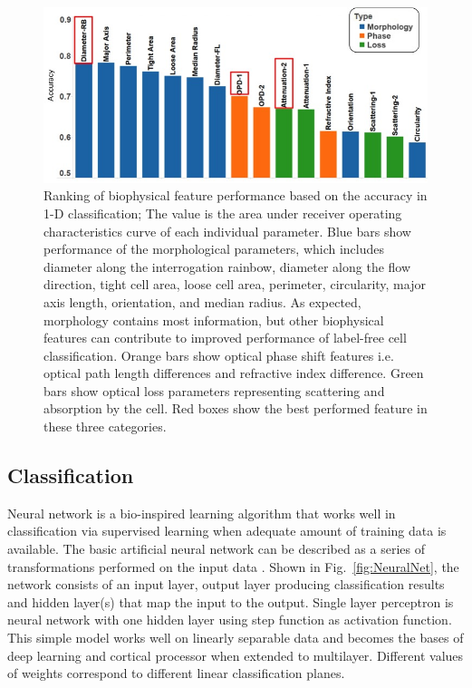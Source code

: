 \documentclass[aps,pra,reprint,superscriptaddress]{revtex4-1}
\begin{document}
\begin{figure}
\includegraphics[scale=0.55]{FigureFeaturesRank.jpg}
\caption{\label{fig:FeaturesRank} Ranking of biophysical feature performance based on the accuracy in 1-D classification; The value is the area under receiver operating characteristics curve of each individual parameter. Blue bars show performance of the morphological parameters, which includes diameter along the interrogation rainbow, diameter along the flow direction, tight cell area, loose cell area, perimeter, circularity, major axis length, orientation, and median radius. As expected, morphology contains most information, but other biophysical features can contribute to improved performance of label-free cell classification. Orange bars show optical phase shift features i.e. optical path length differences and refractive index difference. Green bars show optical loss parameters representing scattering and absorption by the cell. Red boxes show the best performed feature in these three categories.}
\end{figure}

\subsection{Classification}

Neural network is a bio-inspired learning algorithm that works well in classification via supervised learning when adequate amount of training data is available. The basic artificial neural network can be described as a series of transformations performed on the input data \cite{bishop2006pattern, boddy1994neural}. Shown in Fig.~\ref{fig:NeuralNet}, the network consists of an input layer, output layer producing classification results and hidden layer(s) that map the input to the output. Single layer perceptron is neural network with one hidden layer using step function as activation function. This simple model works well on linearly separable data and becomes the bases of deep learning and cortical processor when extended to multilayer. Different values of weights correspond to different linear classification planes. 
\end{document}
